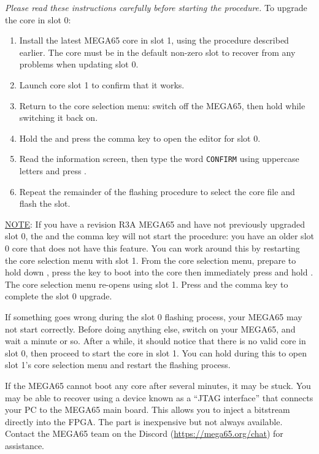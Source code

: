{\em Please read these instructions carefully before starting the procedure.} To upgrade the core in slot 0:

\begin{enumerate}
  \item Install the latest MEGA65 core in slot 1, using the procedure described earlier. The core must be in the default non-zero slot to recover from any problems when updating slot 0.
  \item Launch core slot 1 to confirm that it works.
  \item Return to the core selection menu: switch off the MEGA65, then hold  while switching it back on.
  \item Hold the \megasymbolkey and press the comma key to open the editor for slot 0.
  \item Read the information screen, then type the word {\tt CONFIRM} using uppercase letters and press .
  \item Repeat the remainder of the flashing procedure to select the core file and flash the slot.
\end{enumerate}

\underline{NOTE}: If you have a revision R3A MEGA65 and have not previously upgraded slot 0, the \megasymbolkey and the comma key will not start the procedure: you have an older slot 0 core that does not have this feature. You can work around this by restarting the core selection menu with slot 1. From the core selection menu, prepare to hold down , press the  key to boot into the core then immediately press and hold . The core selection menu re-opens using slot 1. Press \megasymbolkey and the comma key to complete the slot 0 upgrade.

If something goes wrong during the slot 0 flashing process, your MEGA65 may not start correctly. Before doing anything else, switch on your MEGA65, and wait a minute or so. After a while, it should notice that there is no valid core in slot 0, then proceed to start the core in slot 1. You can hold  during this to open slot 1's core selection menu and restart the flashing process.

If the MEGA65 cannot boot any core after several minutes, it may be stuck. You may be able to recover using a device known as a ``JTAG interface'' that connects your PC to the MEGA65 main board. This allows you to inject a bitstream directly into the FPGA. The part is inexpensive but not always available. Contact the MEGA65 team on the Discord (\url{https://mega65.org/chat}) for assistance.

